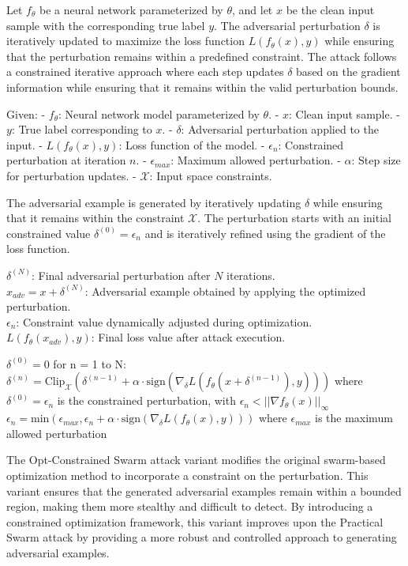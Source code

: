 Let $f_\theta$ be a neural network parameterized by $\theta$, and let $x$ be the clean input sample with the corresponding true label $y$. The adversarial perturbation $\delta$ is iteratively updated to maximize the loss function $L(f_\theta(x), y)$ while ensuring that the perturbation remains within a predefined constraint. The attack follows a constrained iterative approach where each step updates $\delta$ based on the gradient information while ensuring that it remains within the valid perturbation bounds.

Given:
- $f_\theta$: Neural network model parameterized by $\theta$.
- $x$: Clean input sample.
- $y$: True label corresponding to $x$.
- $\delta$: Adversarial perturbation applied to the input.
- $L(f_\theta(x), y)$: Loss function of the model.
- $\epsilon_n$: Constrained perturbation at iteration $n$.
- $\epsilon_{max}$: Maximum allowed perturbation.
- $\alpha$: Step size for perturbation updates.
- $\mathcal{X}$: Input space constraints.

The adversarial example is generated by iteratively updating $\delta$ while ensuring that it remains within the constraint $\mathcal{X}$. The perturbation starts with an initial constrained value $\delta^{(0)} = \epsilon_n$ and is iteratively refined using the gradient of the loss function.

$\delta^{(N)}$: Final adversarial perturbation after $N$ iterations. \\
$x_{adv} = x + \delta^{(N)}$: Adversarial example obtained by applying the optimized perturbation. \\
$\epsilon_n$: Constraint value dynamically adjusted during optimization. \\
$L(f_\theta(x_{adv}), y)$: Final loss value after attack execution.


$\delta^{(0)} = 0$
for n = 1 to N:
$\delta^{(n)} = \text{Clip}_{\mathcal{X}} \left( \delta^{(n-1)} + \alpha \cdot \text{sign} \left( \nabla_\delta L(f_\theta(x + \delta^{(n-1)}), y) \right) \right)$
where $\delta^{(0)} = \epsilon_n$ is the constrained perturbation, with $\epsilon_n < ||\nabla f_\theta(x)||_\infty$
$\epsilon_n = \text{min}(\epsilon_{max}, \epsilon_n + \alpha \cdot \text{sign} \left( \nabla_\delta L(f_\theta(x), y) \right))$ 
where $\epsilon_{max}$ is the maximum allowed perturbation

The Opt-Constrained Swarm attack variant modifies the original swarm-based optimization method to incorporate a constraint on the perturbation. This variant ensures that the generated adversarial examples remain within a bounded region, making them more stealthy and difficult to detect. By introducing a constrained optimization framework, this variant improves upon the Practical Swarm attack by providing a more robust and controlled approach to generating adversarial examples.